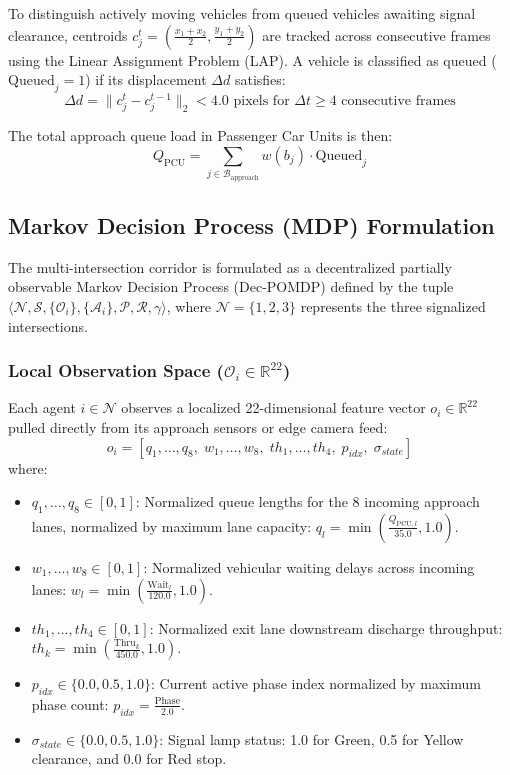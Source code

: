 \documentclass[12pt,a4paper,oneside]{report}
\begin{document}
To distinguish actively moving vehicles from queued vehicles awaiting signal clearance, centroids $c_j^t = \left(\frac{x_1 + x_2}{2}, \frac{y_1 + y_2}{2}\right)$ are tracked across consecutive frames using the Linear Assignment Problem (LAP). A vehicle is classified as queued ($\text{Queued}_j = 1$) if its displacement $\Delta d$ satisfies:
\begin{equation}
\Delta d = \|c_j^t - c_j^{t-1}\|_2 < 4.0 \text{ pixels for } \Delta t \ge 4 \text{ consecutive frames}
\end{equation}

The total approach queue load in Passenger Car Units is then:
\begin{equation}
Q_{\text{PCU}} = \sum_{j \in \mathcal{B}_{\text{approach}}} w(b_j) \cdot \text{Queued}_j
\end{equation}

\subsection{Markov Decision Process (MDP) Formulation}
The multi-intersection corridor is formulated as a decentralized partially observable Markov Decision Process (Dec-POMDP) defined by the tuple $\langle \mathcal{N}, \mathcal{S}, \{\mathcal{O}_i\}, \{\mathcal{A}_i\}, \mathcal{P}, \mathcal{R}, \gamma \rangle$, where $\mathcal{N} = \{1, 2, 3\}$ represents the three signalized intersections.

\subsubsection{Local Observation Space ($\mathcal{O}_i \in \mathbb{R}^{22}$)}
Each agent $i \in \mathcal{N}$ observes a localized 22-dimensional feature vector $o_i \in \mathbb{R}^{22}$ pulled directly from its approach sensors or edge camera feed:
\begin{equation}
o_i = [q_1, \dots, q_8, \; w_1, \dots, w_8, \; th_1, \dots, th_4, \; p_{idx}, \; \sigma_{state}]
\end{equation}
where:
\begin{itemize}
    \item $q_1, \dots, q_8 \in [0, 1]$: Normalized queue lengths for the 8 incoming approach lanes, normalized by maximum lane capacity: $q_l = \min\left(\frac{Q_{\text{PCU}, l}}{35.0}, 1.0\right)$.
    \item $w_1, \dots, w_8 \in [0, 1]$: Normalized vehicular waiting delays across incoming lanes: $w_l = \min\left(\frac{\text{Wait}_l}{120.0}, 1.0\right)$.
    \item $th_1, \dots, th_4 \in [0, 1]$: Normalized exit lane downstream discharge throughput: $th_k = \min\left(\frac{\text{Thru}_k}{450.0}, 1.0\right)$.
    \item $p_{idx} \in \{0.0, 0.5, 1.0\}$: Current active phase index normalized by maximum phase count: $p_{idx} = \frac{\text{Phase}}{2.0}$.
    \item $\sigma_{state} \in \{0.0, 0.5, 1.0\}$: Signal lamp status: 1.0 for Green, 0.5 for Yellow clearance, and 0.0 for Red stop.
\end{itemize}
\end{document}
